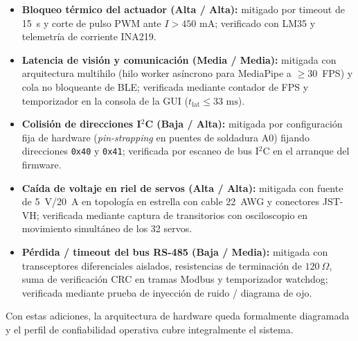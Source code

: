 \documentclass{LabDSTresponse}
\begin{document}
{\begin{enumerate}
    \begin{itemize}
        \item \textbf{Bloqueo térmico del actuador (Alta / Alta):} mitigado por timeout de 15~s y corte de pulso PWM ante $I > 450\text{ mA}$; verificado con LM35 y telemetría de corriente INA219.
        \item \textbf{Latencia de visión y comunicación (Media / Media):} mitigada con arquitectura multihilo (hilo worker asíncrono para MediaPipe a $\ge 30$~FPS) y cola no bloqueante de BLE; verificada mediante contador de FPS y temporizador en la consola de la GUI ($t_{\text{lat}} \le 33\text{ ms}$).
        \item \textbf{Colisión de direcciones I$^2$C (Baja / Alta):} mitigada por configuración fija de hardware (\textit{pin-strapping} en puentes de soldadura A0) fijando direcciones \texttt{0x40} y \texttt{0x41}; verificada por escaneo de bus I$^2$C en el arranque del firmware.
        \item \textbf{Caída de voltaje en riel de servos (Alta / Alta):} mitigada con fuente de 5~V/20~A en topología en estrella con cable 22~AWG y conectores JST-VH; verificada mediante captura de transitorios con osciloscopio en movimiento simultáneo de los 32 servos.
        \item \textbf{Pérdida / timeout del bus RS-485 (Baja / Media):} mitigada con transceptores diferenciales aislados, resistencias de terminación de $120~\Omega$, suma de verificación CRC en tramas Modbus y temporizador watchdog; verificada mediante prueba de inyección de ruido / diagrama de ojo.
    \end{itemize}
\end{enumerate}
Con estas adiciones, la arquitectura de hardware queda formalmente diagramada y el perfil de confiabilidad operativa cubre integralmente el sistema.}
\end{document}

